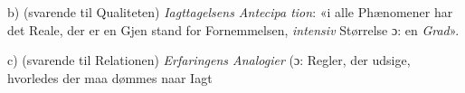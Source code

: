 \documentclass[12pt,a4paper]{book}
\newcommand{\gk}[1]{\textit{#1}}
\begin{document}
b) (svarende til Qualiteten) \emph{Iagttagelsens Antecipa\-%
tion}: «i alle Phænomener har det Reale, der er en Gjen\-%
stand for Fornemmelsen, \emph{intensiv} Størrelse ɔ: en \emph{Grad}».

c) (svarende til Relationen) \emph{Erfaringens Analogier}
(ɔ: Regler, der udsige, hvorledes der maa dømmes naar Iagt\-%
%
%
%
%
%
\end{document}
